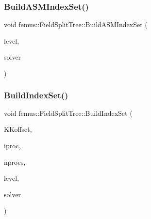 \subsubsection{\texorpdfstring{Build\+A\+S\+M\+Index\+Set()}{BuildASMIndexSet()}}
{\footnotesize\ttfamily void femus\+::\+Field\+Split\+Tree\+::\+Build\+A\+S\+M\+Index\+Set (\begin{DoxyParamCaption}\item[{const unsigned \&}]{level,  }\item[{const Field\+Split\+Petsc\+Linear\+Equation\+Solver $\ast$}]{solver }\end{DoxyParamCaption})}

\mbox{\label{classfemus_1_1_field_split_tree_a9d62836a9933c4135106ec8096640d3b}} 
\subsubsection{\texorpdfstring{Build\+Index\+Set()}{BuildIndexSet()}}
{\footnotesize\ttfamily void femus\+::\+Field\+Split\+Tree\+::\+Build\+Index\+Set (\begin{DoxyParamCaption}\item[{const std\+::vector$<$ std\+::vector$<$ unsigned $>$ $>$ \&}]{K\+Koffset,  }\item[{const unsigned \&}]{iproc,  }\item[{const unsigned \&}]{nprocs,  }\item[{const unsigned \&}]{level,  }\item[{const Field\+Split\+Petsc\+Linear\+Equation\+Solver $\ast$}]{solver }\end{DoxyParamCaption})}

\mbox{\label{classfemus_1_1_field_split_tree_a91c00577aaea85a0c13da54a6e0827a2}} 

